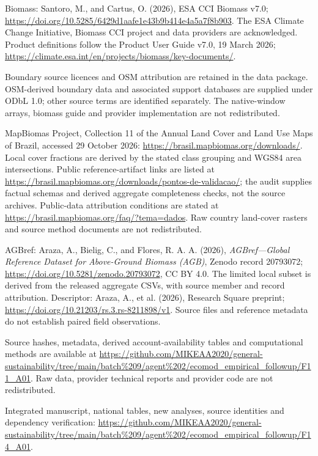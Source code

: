 \documentclass[11pt,a4paper]{article}
\begin{document}
Biomass: Santoro, M., and Cartus, O. (2026), ESA CCI Biomass v7.0; \url{https://doi.org/10.5285/6429d1aafe1e43b9b414e4a5a7f8b903}. The ESA Climate Change Initiative, Biomass CCI project and data providers are acknowledged. Product definitions follow the Product User Guide v7.0, 19 March 2026; \url{https://climate.esa.int/en/projects/biomass/key-documents/}.

Boundary source licences and OSM attribution are retained in the data package. OSM-derived boundary data and associated support databases are supplied under ODbL 1.0; other source terms are identified separately. The native-window arrays, biomass guide and provider implementation are not redistributed.

MapBiomas Project, Collection 11 of the Annual Land Cover and Land Use Maps of Brazil, accessed 29 October 2026: \url{https://brasil.mapbiomas.org/downloads/}. Local cover fractions are derived by the stated class grouping and WGS84 area intersections. Public reference-artifact links are listed at \url{https://brasil.mapbiomas.org/downloads/pontos-de-validacao/}; the audit supplies factual schemas and derived aggregate completeness checks, not the source archives. Public-data attribution conditions are stated at \url{https://brasil.mapbiomas.org/faq/?tema=dados}. Raw country land-cover rasters and source method documents are not redistributed.

AGBref: Araza, A., Bielig, C., and Flores, R. A. A. (2026), \emph{AGBref---Global Reference Dataset for Above-Ground Biomass (AGB)}, Zenodo record 20793072; \url{https://doi.org/10.5281/zenodo.20793072}, CC BY 4.0. The limited local subset is derived from the released aggregate CSVs, with source member and record attribution. Descriptor: Araza, A., et al. (2026), Research Square preprint; \url{https://doi.org/10.21203/rs.3.rs-8211898/v1}. Source files and reference metadata do not establish paired field observations.

Source hashes, metadata, derived account-availability tables and computational methods are available at \url{https://github.com/MIKEAA2020/general-sustainability/tree/main/batch%209/agent%202/ecomod_empirical_followup/F11_A01}. Raw data, provider technical reports and provider code are not redistributed.


Integrated manuscript, national tables, new analyses, source identities and dependency verification: \url{https://github.com/MIKEAA2020/general-sustainability/tree/main/batch%209/agent%202/ecomod_empirical_followup/F14_A01}.
\end{document}
